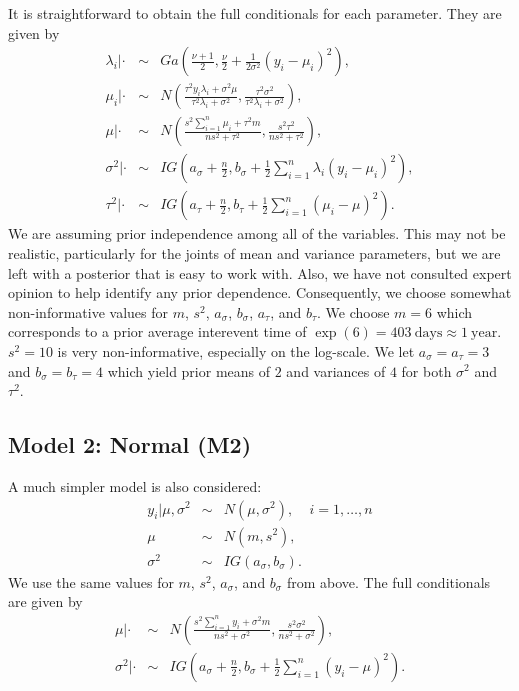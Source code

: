 \documentclass{asaproc}
\begin{document}
It is straightforward to obtain the full conditionals for each parameter. They are given by
\begin{eqnarray*}
\lambda_i|\cdot &\sim& Ga\left(\frac{\nu+1}{2}, \frac{\nu}{2}+\frac{1}{2\sigma^2}(y_i-\mu_i)^2\right), \\
\mu_i|\cdot &\sim& N\left(\frac{\tau^2y_i\lambda_i+\sigma^2\mu}{\tau^2\lambda_i+\sigma^2},\frac{\tau^2\sigma^2}{\tau^2\lambda_i+\sigma^2}\right), \\
\mu|\cdot &\sim& N\left(\frac{s^2\sum_{i=1}^n\mu_i+\tau^2m}{ns^2+\tau^2},\frac{s^2\tau^2}{ns^2+\tau^2}\right), \\
\sigma^2|\cdot &\sim& IG\left(a_\sigma+\frac{n}{2},b_\sigma+\frac{1}{2}\sum_{i=1}^n\lambda_i(y_i-\mu_i)^2\right), \\
\tau^2|\cdot &\sim& IG\left(a_\tau+\frac{n}{2},b_\tau+\frac{1}{2}\sum_{i=1}^n(\mu_i-\mu)^2\right).
\end{eqnarray*}
We are assuming prior independence among all of the variables. This may not be realistic, particularly for the joints of mean and variance parameters, but we are left with a posterior that is easy to work with. Also, we have not consulted expert opinion to help identify any prior dependence. Consequently, we choose somewhat non-informative values for $m$, $s^2$, $a_\sigma$, $b_\sigma$, $a_\tau$, and $b_\tau$. We choose $m=6$ which corresponds to a prior average interevent time of $\exp(6)=403~\mathrm{days} \approx 1~\mathrm{year}$. $s^2=10$ is very non-informative, especially on the log-scale. We let  $a_\sigma=a_\tau=3$ and $b_\sigma=b_\tau=4$ which yield prior means of $2$ and variances of $4$ for both $\sigma^2$ and $\tau^2$.

\subsection{Model 2: Normal (M2)}

A much simpler model is also considered:
\begin{eqnarray*}
y_i|\mu,\sigma^2 &\sim& N(\mu, \sigma^2),~~~~~i=1,\ldots,n \\
\mu &\sim& N(m, s^2), \\
\sigma^2 &\sim& IG(a_\sigma, b_\sigma).
\end{eqnarray*}
We use the same values for $m$, $s^2$, $a_\sigma$, and $b_\sigma$ from above. The full conditionals are given by
\begin{eqnarray*}
\mu|\cdot &\sim& N\left(\frac{s^2\sum_{i=1}^ny_i+\sigma^2m}{ns^2+\sigma^2},\frac{s^2\sigma^2}{ns^2+\sigma^2}\right), \\
\sigma^2|\cdot &\sim& IG\left(a_\sigma+\frac{n}{2},b_\sigma+\frac{1}{2}\sum_{i=1}^n(y_i-\mu)^2\right). \\
\end{eqnarray*}
\end{document}
